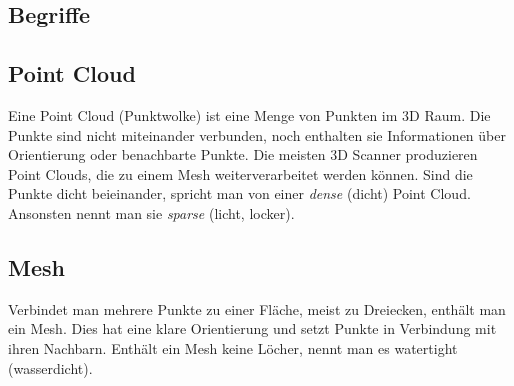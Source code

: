 \documentclass{paper}
\begin{document}
		
			
				

	
	\begin{appendix}
		\section{Begriffe}
			\subsection{Point Cloud}\label{app:point_cloud}
				Eine Point Cloud (Punktwolke) ist eine Menge von Punkten im 3D Raum. Die Punkte sind nicht miteinander verbunden, noch enthalten sie Informationen über Orientierung oder benachbarte Punkte. Die meisten 3D Scanner produzieren Point Clouds, die zu einem Mesh weiterverarbeitet werden können.
				Sind die Punkte dicht beieinander, spricht man von einer \emph{dense} (dicht) Point Cloud. Ansonsten nennt man sie \emph{sparse} (licht, locker).
			
			\subsection{Mesh}\label{app:mesh}
				Verbindet man mehrere Punkte zu einer Fläche, meist zu Dreiecken, enthält man ein Mesh. Dies hat eine klare Orientierung und setzt Punkte in Verbindung mit ihren Nachbarn. Enthält ein Mesh keine Löcher, nennt man es watertight (wasserdicht).
			
	\end{appendix}
	
	\listoffigures
	
	
%	
	\nocite{*}
	
\end{document}
